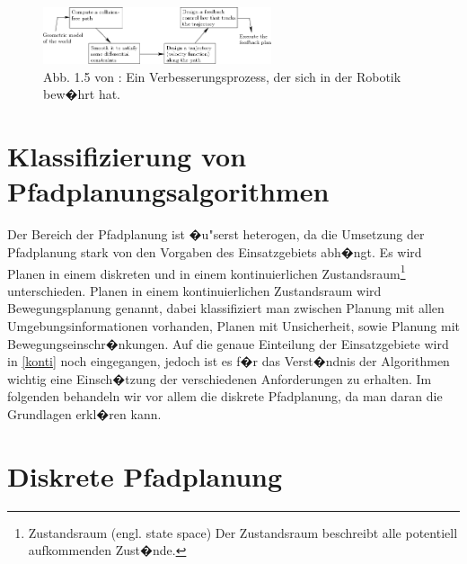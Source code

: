 \begin{figure} %
	\centering
	\includegraphics[width=0.6\textwidth]{images/img247.png}
	\caption{Abb. 1.5 von \cite[~S. 20]{Lav06}:  Ein Verbesserungsprozess, der sich in der Robotik bew�hrt hat.}
	\label{lav02}
\end{figure}

\section{Klassifizierung von Pfadplanungsalgorithmen} \label{Kapitel 4.2} %
Der Bereich der Pfadplanung ist �u"serst heterogen, da die Umsetzung der Pfadplanung stark von den Vorgaben des Einsatzgebiets abh�ngt. 
Es wird Planen in einem diskreten und in einem kontinuierlichen Zustandsraum\footnote{Zustandsraum (engl. state space) Der Zustandsraum beschreibt alle potentiell aufkommenden Zust�nde.} unterschieden. Planen in einem kontinuierlichen Zustandsraum wird Bewegungsplanung genannt, dabei klassifiziert man zwischen Planung mit allen Umgebungsinformationen vorhanden, Planen mit Unsicherheit, sowie Planung mit Bewegungseinschr�nkungen.
Auf die genaue Einteilung der Einsatzgebiete wird in \ref{konti} noch eingegangen, jedoch ist es f�r das Verst�ndnis der Algorithmen wichtig eine Einsch�tzung der verschiedenen Anforderungen zu erhalten. Im folgenden behandeln wir vor allem die diskrete Pfadplanung, da man daran die Grundlagen erkl�ren kann. \cite[~S. 24ff]{Lav06} 

\section{Diskrete Pfadplanung} \label{Kapitel 4.3} %

